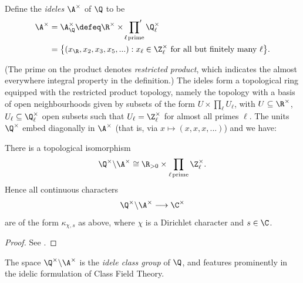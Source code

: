 \documentclass[a4paper,10pt, english, reqno]{smfart}
\numberwithin{equation}{section}
\begin{document}
\begin{definition}
	Define the \emph{ideles} $\A^\times$ of $\Q$ to be
	\begin{align*}\A^\times &= \A_{\Q}^\times \defeq \R^\times \times \sideset{}{'}\prod_{\ell\hspace{1pt}\mathrm{prime}} \Q_\ell^\times\\
		&= \big\{(x_{\R},x_2,x_3,x_5,...) : x_\ell \in \Z_\ell^\times \text{ for all but finitely many }\ell\big\}.
	\end{align*}

(The prime on the product denotes \emph{restricted product}, which indicates the almost everywhere integral property in the definition.)  The ideles form a topological ring equipped with the restricted product topology, namely the topology with a basis of open neighbourhoods given by subsets of the form $U \times \prod_\ell U_\ell$, with $U \subseteq \R^\times$, $U_\ell \subseteq \Q_\ell^\times$ open subsets such that $U_\ell = \Z_\ell^\times$ for almost all primes $\ell$. The units $\Q^\times$ embed diagonally in $\A^\times$ (that is, via $x \mapsto (x,x,x,...)$) and we have:

\end{definition}

\begin{proposition} There is a topological isomorphism
	\[ \Q^\times \backslash \A^\times \cong \R_{>0} \times \prod_{\ell\hspace{1pt}\mathrm{prime}}\Z_\ell^\times.\]
	Hence all continuous characters
	\[\Q^\times \backslash \A^\times \longrightarrow \C^\times\]
	are of the form $\kappa_{\chi,s}$ as above, where $\chi$ is a Dirichlet character and $s \in \C$.
\end{proposition}

\begin{proof}
See \cite[Proposition I.4.6]{GoldfeldHundley}.
\end{proof}


\begin{remark}The space $\Q^\times\backslash\A^\times$ is the \emph{idele class group} of $\Q$, and features prominently in the idelic formulation of Class Field Theory.
\end{remark}
\end{document}
